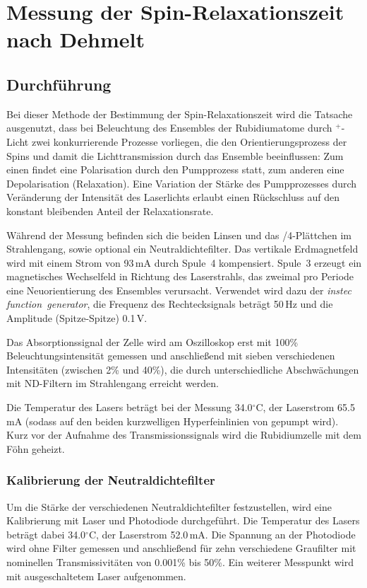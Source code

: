 \section{Messung der Spin-Relaxationszeit nach Dehmelt}
\label{sect:dehmelt}
\subsection{Durchführung}
Bei dieser Methode der Bestimmung der Spin-Relaxationszeit wird die Tatsache ausgenutzt,
dass bei Beleuchtung des Ensembles der Rubidiumatome durch \textsigma$^+$-Licht
zwei konkurrierende Prozesse vorliegen, die den Orientierungsprozess der Spins und damit
die Lichttransmission durch das Ensemble beeinflussen:
Zum einen findet eine Polarisation durch den Pumpprozess statt,
zum anderen eine Depolarisation (Relaxation).
Eine Variation der Stärke des Pumpprozesses durch Veränderung der Intensität des Laserlichts
erlaubt einen Rückschluss auf den konstant bleibenden Anteil der Relaxationsrate.

Während der Messung befinden sich die beiden Linsen und das \textlambda/4-Plättchen im Strahlengang,
sowie optional ein Neutraldichtefilter.
Das vertikale Erdmagnetfeld wird mit einem Strom von 93\,mA durch Spule~4 kompensiert.
Spule~3 erzeugt ein magnetisches Wechselfeld in Richtung des Laserstrahls,
das zweimal pro Periode eine Neuorientierung des Ensembles verursacht.
Verwendet wird dazu der \emph{instec function~generator},
die Frequenz des Rechtecksignals beträgt 50\,Hz und die Amplitude (Spitze-Spitze) 0.1\,V.

Das Absorptionssignal der Zelle wird am Oszilloskop erst mit 100\% Beleuchtungsintensität gemessen
und anschließend mit sieben verschiedenen Intensitäten (zwischen 2\% und 40\%),
die durch unterschiedliche Abschwächungen mit ND-Filtern im Strahlengang erreicht werden.

Die Temperatur des Lasers beträgt bei der Messung 34.0$^\circ$C, der Laserstrom 65.5\,mA
(sodass auf den beiden kurzwelligen Hyperfeinlinien von  gepumpt wird).
Kurz vor der Aufnahme des Transmissionssignals wird die Rubidiumzelle mit dem Föhn geheizt.






\subsubsection*{Kalibrierung der Neutraldichtefilter}
Um die Stärke der verschiedenen Neutraldichtefilter festzustellen,
wird eine Kalibrierung mit Laser und Photodiode durchgeführt.
Die Temperatur des Lasers beträgt dabei 34.0$^\circ$C, der Laserstrom 52.0\,mA.
Die Spannung an der Photodiode wird ohne Filter gemessen und anschließend für zehn verschiedene Graufilter
mit nominellen Transmissivitäten von 0.001\% bis 50\%.
Ein weiterer Messpunkt wird mit ausgeschaltetem Laser aufgenommen.


